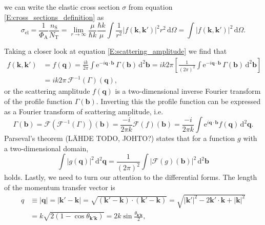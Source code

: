 \documentclass[a4paper, twoside, english, 12pt]{article}
\begin{document}
we can write the elastic cross section $\sigma$ from equation \eqref{E:cross_sections_definition} as 
\begin{equation}\label{E:sigma_from_f}
	\sigma_{\text{el}} = \frac{1}{\Phi_\text{A}} \frac{n_\text{S}}{N_{\text{T}}} = \lim\limits_{r\rightarrow \infty} \frac{\mu}{\hbar k}\frac{\hbar k}{\mu} \int \frac{1}{r^2} \left|f(\mathbf{k},\mathbf{k'})\right|^2 r^2 \, \text{d}\Omega = \int \left|f(\mathbf{k},\mathbf{k'})\right|^2 \, \text{d}\Omega.
\end{equation}

Taking a closer look at equation \eqref{E:scattering_amplitude} we find that 
\begin{align}\label{E:f_from_gamma}
	f(\mathbf{k},\mathbf{k'}) &= f(\mathbf{q}) = \frac{ik}{2\pi}\int \text{e}^{-i\mathbf{q}\cdot\mathbf{b}}\,\Gamma(\mathbf{b}) \,\text{d}^2\mathbf{b} = ik2\pi\left[\frac{1}{(2\pi)^2}\int \text{e}^{-i\mathbf{q}\cdot\mathbf{b}}\,\Gamma(\mathbf{b}) \,\text{d}^2\mathbf{b}\right] \nonumber \\
	&=ik2\pi \,\mathcal{F}^{-1}(\Gamma)(\mathbf{q}),
\end{align}
or the scattering amplitude $f(\mathbf{q})$ is a two-dimensional inverse Fourier transform of the profile function $\Gamma(\mathbf{b})$. Inverting this the profile function can be expressed as a Fourier transform of scattering amplitude, i.e.
\begin{equation}\label{E:gamma_from_f}
	\Gamma (\mathbf{b}) = \mathcal{F}\left(\mathcal{F}^{-1}(\Gamma)\right)(\mathbf{b}) = \frac{-i}{2\pi k}\mathcal{F}\left(f\right)(\mathbf{b}) = \frac{-i}{2\pi k} \int \text{e}^{i\mathbf{q}\cdot\mathbf{b}}f(\mathbf{q}) \,\text{d}^2\mathbf{q}.
\end{equation}
Parseval's theorem (LÄHDE TODO, JOHTO?) states that for a function $g$ with a two-dimensional domain,
\begin{equation}\label{E:Parsevals_theorem}
	\int |g(\mathbf{q})|^2\,\text{d}^2\mathbf{q} = \frac{1}{(2\pi)^2} \int |\mathcal{F}\left(g\right)(\mathbf{b})|^2\,\text{d}^2\mathbf{b}
\end{equation}
holds. 	Lastly, we need to turn our attention to the differential forms. The length of the momentum transfer vector is
\begin{align}\label{E:qs_length}
	q&\equiv|\mathbf{q}|=|\mathbf{k'}-\mathbf{k}|=\sqrt{\left(\mathbf{k'}-\mathbf{k}\right)\cdot\left(\mathbf{k'}-\mathbf{k}\right)}=\sqrt{|\mathbf{k'}|^2 -2\mathbf{k'}\cdot\mathbf{k} + |\mathbf{k}|^2} \nonumber \\
	&=k\sqrt{2\left(1-\cos\theta_{\mathbf{k'}\mathbf{k}}\right)} = 2k\sin\frac{\theta_{\mathbf{k'}\mathbf{k}}}{2},
\end{align}
\end{document}
